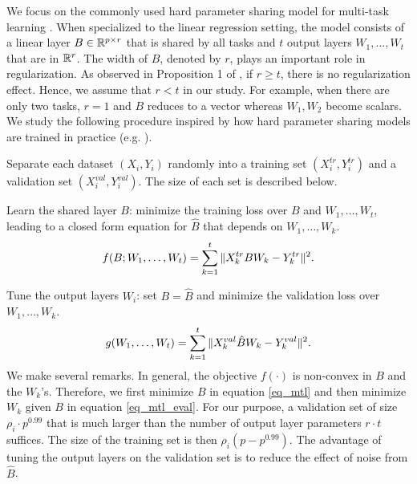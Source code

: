 We focus on the commonly used hard parameter sharing model for multi-task learning \cite{R17}.
When specialized to the linear regression setting, the model consists of a linear layer $B\in\mathbb{R}^{p\times r}$ that is shared by all tasks and $t$ output layers $W_1, \dots, W_t$ that are in $\mathbb{R}^r$.
The width of $B$, denoted by $r$, plays an important role in regularization.
As observed in Proposition 1 of \cite{WZR20}, if $r \ge t$, there is no regularization effect.
Hence, we assume that $r < t$ in our study.
For example, when there are only two tasks, $r = 1$ and $B$ reduces to a vector whereas $W_1, W_2$ become scalars.
We study the following procedure inspired by how hard parameter sharing models are trained in practice (e.g. \cite{MTDNN19}).
\squishlist
	\item Separate each dataset $(X_i, Y_i)$ randomly into a training set $(X_i^{tr}, Y_i^{tr})$ and a validation set $(X_i^{val}, Y_i^{val})$.
	The size of each set is described below.
	\item Learn the shared layer $B$: minimize the training loss over $B$ and $W_1, \dots, W_t$, leading to a closed form equation for $\hat{B}$ that depends on $W_1,\dots, W_k$.
		\vspace{-0.075in}
		{\small\begin{align}\label{eq_mtl}
			f(B; W_1, \dots, W_t) = \sum_{k=1}^t \|X_k^{tr} B W_k - Y_k^{tr}\|^2.
		\end{align}}
		\vspace{-0.075in}
	\item Tune the output layers $W_i$: set $B = \hat{B}$ and minimize the validation loss over $W_1,\dots, W_k$.
		\vspace{-0.075in}
		{\small\begin{align}\label{eq_mtl_eval}
			g(W_1, \dots, W_t) = \sum_{k=1}^t \|X_k^{val} \hat{B} W_k - Y_k^{val}\|^2.
		\end{align}}
		\vspace{-0.075in}
\squishend
\vspace{-0.1in}
We make several remarks.
In general, the objective $f(\cdot)$ is non-convex in $B$ and the $W_k$'s.
Therefore, we first minimize $B$ in equation \eqref{eq_mtl} and then minimize $W_k$ given $B$ in equation \eqref{eq_mtl_eval}.
For our purpose, a validation set of size $\rho_i \cdot p^{0.99}$ that is much larger than the number of output layer parameters $r\cdot t$ suffices.
The size of the training set is then $\rho_i (p - p^{0.99})$.
The advantage of tuning the output layers on the validation set is to reduce the effect of noise from $\hat{B}$.

